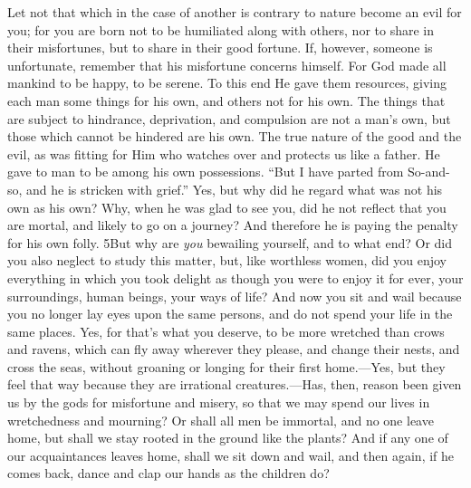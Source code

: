Let not that which in the case of another is contrary to nature become an evil for you; for you are born not to be humiliated along with others, nor to share in their misfortunes, but to share in their good fortune. If, however, someone is unfortunate, remember that his misfortune concerns himself. For God made all mankind to be happy, to be serene. To this end He gave them resources, giving each man some things for his own, and others not for his own. The things that are subject to hindrance, deprivation, and compulsion are not a man's own, but those which cannot be hindered are his own. The true nature of the good and the evil, as was fitting for Him who watches over and protects us like a father. He gave to man to be among his own possessions. ``But I have parted from So-and-so, and he is stricken with grief.'' Yes, but why did he regard what was not his own as his own? Why, when he was glad to see you, did he not reflect that you are mortal, and likely to go on a journey? And therefore he is paying the penalty for his own folly. 5But why are \emph{you} bewailing yourself, and to what end? Or did you also neglect to study this matter, but, like worthless women, did you enjoy everything in which you took delight as though you were to enjoy it for ever, your surroundings, human beings, your ways of life? And now you sit and wail because you no longer lay eyes upon the same persons, and do not spend your life in the same places. Yes, for that's what you deserve, to be more wretched than crows and ravens, which can fly away wherever they please, and change their nests, and cross the seas, without groaning or longing for their first home.—Yes, but they feel that way because they are irrational creatures.—Has, then, reason been given us by the gods for misfortune and misery, so that we may spend our lives in wretchedness and mourning? Or shall all men be immortal, and no one leave home, but shall we stay rooted in the ground like the plants? And if any one of our acquaintances leaves home, shall we sit down and wail, and then again, if he comes back, dance and clap our hands as the children do?

